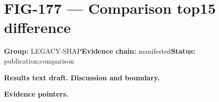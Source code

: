 \clearpage
\section{FIG-177 --- Comparison top15 difference}
\label{figpage:fig-177}
\textbf{Group:} LEGACY-SHAP\quad \textbf{Evidence chain:} manifested\quad \textbf{Status:} publication;comparison

\textbf{Results text draft.} 
\textbf{Discussion and boundary.} 


\textbf{Evidence pointers.}



\vfill
